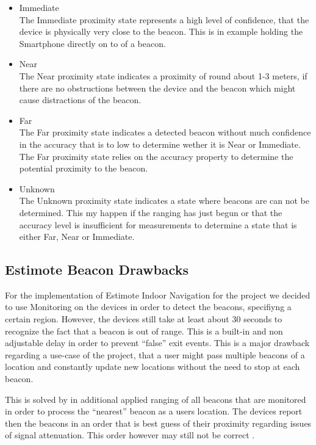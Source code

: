 \begin{itemize}

    \item Immediate\\
    The Immediate proximity state represents a high level of confidence, that the device is physically very close to the beacon. This is in example holding the Smartphone directly on to of a beacon.
    \item Near\\
    The Near proximity state indicates a proximity of round about 1-3 meters, if there are no obstructions between the device and the beacon which might cause distractions of the beacon.
    \item Far\\
    The Far proximity state indicates a detected beacon without much confidence in the accuracy that is to low to determine wether it is Near or Immediate. The Far proximity state relies on the accuracy property to determine the potential proximity to the beacon.
    \item Unknown\\
    The Unknown proximity state indicates a state where beacons are can not be determined. This my happen if the ranging has just begun or that the accuracy level is insufficient for measurements to determine a state that is either Far, Near or Immediate.
\end{itemize}

\subsection{Estimote Beacon Drawbacks}

For the implementation of Estimote Indoor Navigation for the project we decided to use Monitoring on the devices in order to detect the beacons, specifiyng a certain region. However, the devices still take at least about 30 seconds to recognize the fact that a beacon is out of range. This is a  built-in and non adjustable delay in order to prevent \enquote{false} exit events.\cite{developerDocsEstimote} This is a major drawback regarding a use-case of the project, that a user might pass multiple beacons of a location and constantly update new locations without the need to stop at each beacon.

This is solved by in additional applied ranging of all beacons that are monitored in order to process the \enquote{nearest} beacon as a users location. The devices report then the beacons in an order that is best guess of their proximity regarding issues of signal attenuation. This order however may still not be correct \cite{appleIBeacon}.


